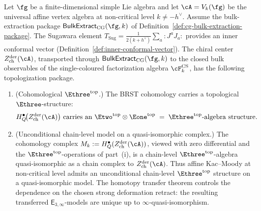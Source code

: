 \begin{theorem}
\label{thm:topologization}
\ClaimStatusConditional
{}
Let $\fg$ be a finite-dimensional simple Lie algebra
and let $\cA = V_k(\fg)$ be the universal affine
vertex algebra at non-critical level $k \neq -h^\vee$.
Assume the bulk-extraction package
$\mathsf{BulkExtract}_{\mathrm{CG}}(\fg,k)$ of
Definition~\ref{def:cg-bulk-extraction-package}.
The Sugawara element
$T_{\mathrm{Sug}} = \frac{1}{2(k+h^\vee)}\sum_a {:}J^a J_a{:}$
provides an inner conformal vector
\textup{(}Definition~\textup{\ref{def:inner-conformal-vector}}\textup{)}.
The chiral center $Z^{\mathrm{der}}_{\mathrm{ch}}(\cA)$,
transported through
$\mathsf{BulkExtract}_{\mathrm{CG}}(\fg,k)$ to the closed bulk
observables of the single-coloured factorization algebra
$\cF^{\mathrm{CS}}_k$,
has the following topologization package.
\begin{enumerate}[label=\textup{(\roman*)}]
\item \textup{(Cohomological $\Ethree^{\mathrm{top}}$.)}
 The BRST cohomology carries a topological
 $\Ethree$-structure:
 \begin{equation}\label{eq:topologization}
 H_Q^\bullet\!\bigl(Z^{\mathrm{der}}_{\mathrm{ch}}(\cA)\bigr)
 \text{ carries an }
 \Etwo^{\mathrm{top}} \otimes \Eone^{\mathrm{top}}
 \;=\; \Ethree^{\mathrm{top}}\text{-algebra structure}.
 \end{equation}

\item \textup{(Unconditional chain-level model on a
 quasi-isomorphic complex.)}
 The cohomology complex
 $M_k := H_Q^\bullet(Z^{\mathrm{der}}_{\mathrm{ch}}(\cA))$,
 viewed with zero differential and the
 $\Ethree^{\mathrm{top}}$-operations of part~\textup{(i)},
 is a chain-level $\Ethree^{\mathrm{top}}$-algebra
 quasi-isomorphic as a chain complex to
 $Z^{\mathrm{der}}_{\mathrm{ch}}(\cA)$.
 Thus affine Kac--Moody at non-critical level admits an
 unconditional chain-level $\Ethree^{\mathrm{top}}$
 structure on a quasi-isomorphic model.
 The homotopy transfer theorem controls the dependence on
 the chosen strong deformation retract:
 the resulting transferred $\mathsf{E}_{3,\infty}$-models are
 unique up to $\infty$-quasi-isomorphism.


\end{enumerate}
\end{theorem}
